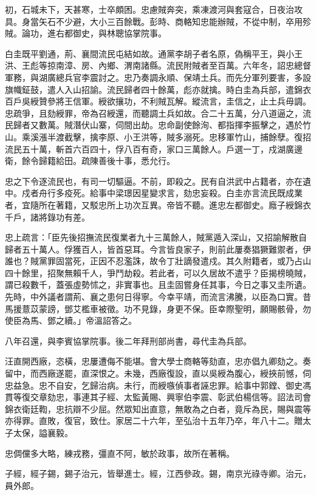 \begin{pinyinscope}
初，石城未下，天甚寒，士卒頗困。忠慮賊奔突，乘凍渡河與套寇合，日夜治攻具。身當矢石不少避，大小三百餘戰。彭時、商輅知忠能辦賊，不從中制，卒用殄賊。論功，進右都御史，與林聰協掌院事。

白圭既平劉通，荊、襄間流民屯結如故。通黨李胡子者名原，偽稱平王，與小王洪、王彪等掠南漳、房、內鄉、渭南諸縣。流民附賊者至百萬。六年冬，詔忠總督軍務，與湖廣總兵官李震討之。忠乃奏調永順、保靖土兵。而先分軍列要害，多設旗幟鉦鼓，遣人入山招諭。流民歸者四十餘萬，彪亦就擒。時白圭為兵部，遣錦衣百戶吳綬贊參將王信軍。綬欲攘功，不利賊瓦解。縱流言，圭信之，止土兵毋調。忠疏爭，且劾綬罪，帝為召綬還，而聽調土兵如故。合二十五萬，分八道逼之，流民歸者又數萬。賊潛伏山寨，伺間出劫。忠命副使餘洵、都指揮李振擊之，遇於竹山。乘溪漲半渡截擊，擒李原、小王洪等，賊多溺死。忠移軍竹山，捕餘孽。復招流民五十萬，斬首六百四十，俘八百有奇，家口三萬餘人。戶選一丁，戍湖廣邊衛，餘令歸籍給田。疏陳善後十事，悉允行。

忠之下令逐流民也，有司一切驅逼。不前，即殺之。民有自洪武中占籍者，亦在遺中。戍者舟行多疫死。給事中梁璟因星變求言，劾忠妄殺。白圭亦言流民既成業者，宜隨所在著籍，又駁忠所上功次互異。帝皆不聽。進忠左都御史。廕子綬錦衣千戶，諸將錄功有差。

忠上疏言：「臣先後招撫流民復業者九十三萬餘人，賊黨遁入深山，又招諭解散自歸者五十萬人。俘獲百人，皆首惡耳。今言皆良家子，則前此屢奏猖獗難禦者，伊誰也？賊黨罪固當死，正因不忍濫誅，故令丁壯謫發遣戍。其久附籍者，或乃占山四十餘里，招聚無賴千人，爭鬥劫殺。若此者，可以久居故不遣乎？臣揭榜曉賊，謂已殺數千，蓋張虛勢怵之，非實事也。且圭固嘗身任其事，今日之事又圭所遺。先時，中外議者謂荊、襄之患何日得寧。今幸平靖，而流言沸騰，以臣為口實。昔馬援薏苡蒙謗，鄧艾檻車被徵。功不見錄，身更不保。臣幸際聖明，願賜骸骨，勿使臣為馬、鄧之續。」帝溫詔答之。

八年召還，與李賓協掌院事。後二年拜刑部尚書，尋代圭為兵部。

汪直開西廠，恣橫，忠屢遭侮不能堪。會大學士商輅等劾直，忠亦倡九卿劾之。奏留中，而西廠遂罷，直深恨之。未幾，西廠復設，直以吳綬為腹心，綬挾前憾，伺忠益急。忠不自安，乞歸治病。未行，而綬嗾偵事者誣忠罪。給事中郭鏜、御史馮貫等復交章劾忠，事連其子經、太監黃賜、興寧伯李震、彰武伯楊信等。詔法司會錦衣衛廷鞫，忠抗辯不少屈。然眾知出直意，無敢為之白者，竟斥為民，賜與震等亦得罪。直敗，復官，致仕。家居二十六年，至弘治十五年乃卒，年八十二。贈太子太保，謚襄毅。

忠倜儻多大略，練戎務，彊直不阿，敏於政事，故所在著稱。

子經，經子錫，錫子治元，皆舉進士。經，江西參政。錫，南京光祿寺卿。治元，員外郎。


\end{pinyinscope}
